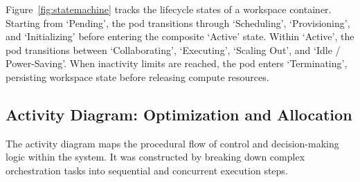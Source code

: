 \documentclass[12pt,a4paper]{report}
\begin{document}
Figure~\ref{fig:statemachine} tracks the lifecycle states of a workspace container. Starting from `Pending', the pod transitions through `Scheduling', `Provisioning', and `Initializing' before entering the composite `Active' state. Within `Active', the pod transitions between `Collaborating', `Executing', `Scaling Out', and `Idle / Power-Saving'. When inactivity limits are reached, the pod enters `Terminating', persisting workspace state before releasing compute resources.

\clearpage
\subsection{Activity Diagram: Optimization and Allocation}

The activity diagram maps the procedural flow of control and decision-making logic within the system. It was constructed by breaking down complex orchestration tasks into sequential and concurrent execution steps.
\end{document}
